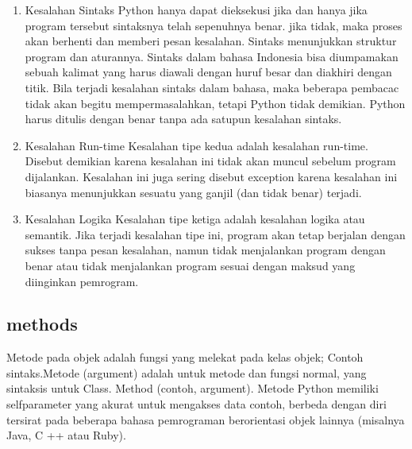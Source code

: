 	\begin {enumerate}
	
	\item
	Kesalahan Sintaks
	   Python hanya dapat dieksekusi jika dan hanya jika program tersebut sintaksnya telah sepenuhnya benar.
	   jika tidak, maka proses akan berhenti dan memberi pesan kesalahan. Sintaks menunjukkan struktur program dan aturannya.
	   Sintaks dalam bahasa Indonesia bisa diumpamakan sebuah kalimat yang harus diawali dengan huruf besar dan 
	   diakhiri dengan titik. Bila terjadi kesalahan sintaks dalam bahasa, maka beberapa pembacac tidak akan begitu mempermasalahkan, tetapi Python
	   tidak demikian. Python harus ditulis dengan benar tanpa ada satupun kesalahan sintaks.
	
	\item
	Kesalahan Run-time
	   Kesalahan tipe kedua adalah kesalahan run-time. Disebut demikian karena kesalahan ini tidak akan muncul sebelum program dijalankan.
	   Kesalahan ini juga sering disebut exception karena kesalahan ini biasanya menunjukkan sesuatu yang ganjil (dan tidak benar) terjadi.
	
	\item
	Kesalahan Logika 
	   Kesalahan tipe ketiga adalah kesalahan logika atau semantik. Jika terjadi kesalahan tipe ini, program akan tetap berjalan dengan sukses tanpa 
	   pesan kesalahan, namun tidak menjalankan program dengan benar atau tidak menjalankan program sesuai dengan
	   maksud yang diinginkan pemrogram.
	
	\end {enumerate}
	
\subsection {methods}
	Metode pada objek adalah fungsi yang melekat pada kelas objek; Contoh sintaks.Metode (argument) adalah untuk metode dan fungsi normal, 
	yang sintaksis untuk Class. Method (contoh, argument). Metode Python memiliki selfparameter yang akurat untuk mengakses data contoh, 
	berbeda dengan diri tersirat pada beberapa bahasa pemrograman berorientasi objek lainnya (misalnya Java, C ++ atau Ruby). 
	
